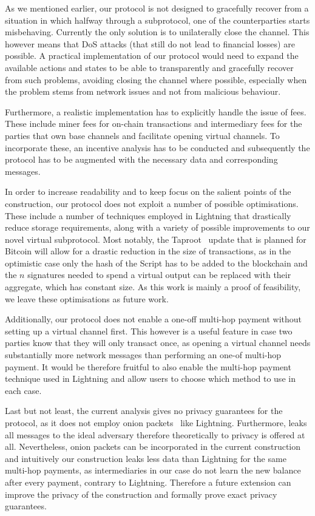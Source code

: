   As we mentioned earlier, our protocol is not designed to gracefully recover
  from a situation in which halfway through a subprotocol, one of the
  counterparties starts misbehaving. Currently the only solution is to
  unilaterally close the channel. This however means that DoS attacks (that
  still do not lead to financial losses) are possible. A practical
  implementation of our protocol would need to expand the available actions and
  states to be able to transparently and gracefully recover from such problems,
  avoiding closing the channel where possible, especially when the problem stems
  from network issues and not from malicious behaviour.

  Furthermore, a realistic implementation has to explicitly handle the issue of
  fees. These include miner fees for on-chain transactions and intermediary fees
  for the parties that own base channels and facilitate opening virtual
  channels. To incorporate these, an incentive analysis has to be conducted and
  subsequently the protocol has to be augmented with the necessary data and
  corresponding messages.

  In order to increase readability and to keep focus on the salient points of
  the construction, our protocol does not exploit a number of possible
  optimisations. These include a number of techniques employed in Lightning that
  drastically reduce storage requirements, along with a variety of possible
  improvements to our novel virtual subprotocol. Most notably, the
  Taproot~\cite{taproot} update that is planned for Bitcoin will allow for a
  drastic reduction in the size of transactions, as in the optimistic case only
  the hash of the Script has to be added to the blockchain and the $n$
  signatures needed to spend a virtual output can be replaced with their
  aggregate, which has constant size. As this work is mainly a proof of
  feasibility, we leave these optimisations as future work.

  Additionally, our protocol does not enable a one-off multi-hop payment without
  setting up a virtual channel first. This however is a useful feature in case
  two parties know that they will only transact once, as opening a virtual
  channel needs substantially more network messages than performing an one-of
  multi-hop payment. It would be therefore fruitful to also enable the multi-hop
  payment technique used in Lightning and allow users to choose which method to
  use in each case.

  Last but not least, the current analysis gives no privacy guarantees for the
  protocol, as it does not employ onion packets~\cite{sphinx} like Lightning.
  Furthermore, \fchan leaks all messages to the ideal adversary therefore
  theoretically to privacy is offered at all. Nevertheless, onion packets can be
  incorporated in the current construction and intuitively our construction
  leaks less data than Lightning for the same multi-hop payments, as
  intermediaries in our case do not learn the new balance after every payment,
  contrary to Lightning. Therefore a future extension can improve the privacy of
  the construction and formally prove exact privacy guarantees.
